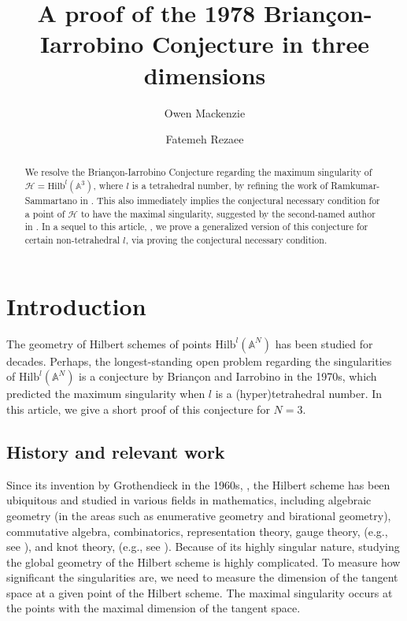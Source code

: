 \documentclass[11pt,a4paper,leqno,noamsfonts]{amsart}
\title[A proof of the 1978  Brian\c{c}on-Iarrobino Conjecture in three dimensions]{A proof of the 1978  Brian\c{c}on-Iarrobino Conjecture in three dimensions}
\author{Owen Mackenzie}
\author{Fatemeh Rezaee}
\numberwithin{equation}{section}
\newcommand{\BA}{{\mathbb{A}}}
\theoremstyle{definition}
\theoremstyle{thm}
\theoremstyle{ex}
\theoremstyle{sol}
\begin{document}
\maketitle
\begin{abstract}

We resolve the Brian\c{c}on-Iarrobino Conjecture regarding the maximum singularity of $\mathcal{H}=\mathrm{Hilb}^{l}(\mathbb{A}^3)$, where $l$ is a tetrahedral number, by refining the work of Ramkumar-Sammartano in \cite{Ramkumar-Sammartano}. This also immediately implies the conjectural necessary condition for a point of $\mathcal{H}$ to have the maximal singularity, suggested by the second-named author in \cite{Rezaee-23-Conjectures}. In a sequel to this article, \cite{Mackenzie-Rezaee2}, we prove a generalized version of this conjecture for certain non-tetrahedral $l$, via proving the conjectural necessary condition. 
\end{abstract}


{\hypersetup{linkcolor=black}
\tableofcontents}



\section{Introduction} 

The geometry of Hilbert schemes of points $\mathrm{Hilb}^l(\BA^N)$ has been studied for decades.  Perhaps, the longest-standing open problem regarding the singularities  of $\mathrm{Hilb}^l(\BA^N)$  is a conjecture by Brian\c{c}on and Iarrobino in the 1970s, which predicted the maximum singularity when $l$ is a (hyper)tetrahedral number. In this article, we give a short proof of this conjecture for $N=3$.

\subsection{History and relevant work} 


Since its invention by Grothendieck in the 1960s, \cite{Grothendieck}, the Hilbert scheme has been ubiquitous and studied in various fields in mathematics, including algebraic geometry (in the areas such as enumerative geometry and birational geometry), commutative algebra, combinatorics, representation theory, gauge theory, (e.g., see \cite{Grojnowski}), and knot theory, (e.g., see \cite{GORSKY2015403}). Because of its highly singular nature, studying the global geometry of the Hilbert scheme is highly complicated. To measure how significant the singularities are, we need to measure the dimension of the tangent space at a given point of the Hilbert scheme. The maximal singularity occurs at the points with the maximal dimension of the tangent space. 
\end{document}
